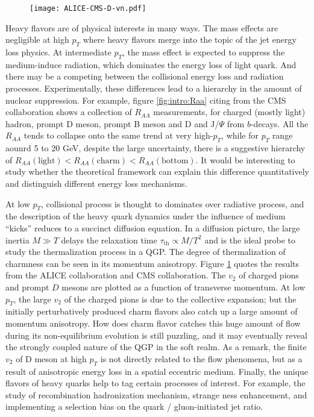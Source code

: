 \begin{figure}
\centering
\texttt{[image: ALICE-CMS-D-vn.pdf]}
\caption{}
\label{fig:intro:D-vn}
\end{figure}

Heavy flavors are of physical interests in many ways.
The mass effects are negligible at high $p_T$ where heavy flavors merge into the topic of the jet energy loss physics.
At intermediate $p_T$, the mass effect is expected to suppress the medium-induce radiation, which dominates the energy loss of light quark.
And there may be a competing between the collisional energy loss and radiation processes.
Experimentally, these differences lead to a hierarchy in the amount of nuclear suppression.
For example, figure \ref{fig:intro:Raa} citing from the CMS collaboration shows a collection of $R_{AA}$ measurements, for charged (mostly light) hadron, prompt D meson, prompt B meson and D and J/$\Psi$ from $b$-decays.
All the $R_{AA}$ tends to collapse onto the same trend at very high-$p_T$, while for $p_T$ range aounrd 5 to 20 GeV, despite the large uncertainty, there is a suggestive hierarchy of $R_{AA}(\textrm{light}) < R_{AA}(\textrm{charm}) < R_{AA}(\textrm{bottom})$.
It would be interesting to study whether the theoretical framework can explain this difference quantitatively and distinguish different energy loss mechanisms.

At low $p_T$, collisional process is thought to dominates over radiative process, and the description of the heavy quark dynamics under the influence of medium ``kicks'' reduces to a succinct diffusion equation.
In a diffusion picture, the large inertia $M\gg T$ delays the relaxation time $\tau_{\textrm{th}} \propto M/T^2$ and is the ideal probe to study the thermalization process in a QGP.
The degree of thermalization of charmness can be seen in its momentum anisotropy.
Figure \ref{fig:intro:D-vn} quotes the results from the ALICE collaboration and CMS collaboration.
The $v_2$ of charged pions and prompt $D$ mesons are plotted as a function of transverse momentum.
At low $p_T$, the large $v_2$ of the charged pions is due to the collective expansion; but the initially perturbatively produced charm flavors also catch up a large amount of momentum anisotropy.
How does charm flavor catches this huge amount of flow during its non-equilibrium evolution is still puzzling, and it may eventually reveal the strongly coupled nature of the QGP in the soft realm.
As a remark, the finite $v_2$ of D meson at high $p_T$ is not directly related to the flow phenomena, but as a result of anisotropic energy loss in a spatial eccentric medium.
Finally, the unique flavors of heavy quarks help to tag certain processes of interest. 
For example, the study of recombination hadronization mechanism, strange ness enhancement, and implementing a selection bias on the quark / gluon-initiated jet ratio.

